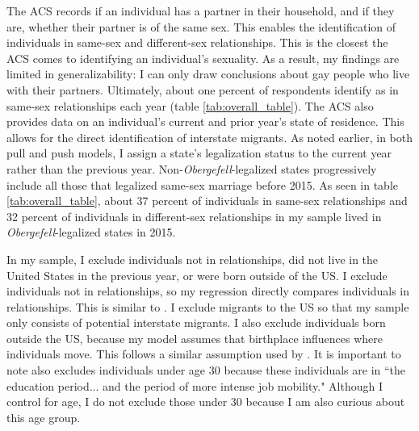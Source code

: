 \documentclass[12pt,letterpaper]{article}
\begin{document}
The ACS records if an individual has a partner in their household, and if they are, whether their partner is of the same sex. This enables the identification of individuals in same-sex and different-sex relationships. This is the closest the ACS comes to identifying an individual's sexuality. As a result, my findings are limited in generalizability: I can only draw conclusions about gay people who live with their partners. Ultimately, about one percent of respondents identify as in same-sex relationships each year (table \ref{tab:overall_table}). The ACS also provides data on an individual's current and prior year's state of residence. This allows for the direct identification of interstate migrants. As noted earlier, in both pull and push models, I assign a state's legalization status to the current year rather than the previous year. Non-\textit{Obergefell}-legalized states progressively include all those that legalized same-sex marriage before 2015. As seen in table \ref{tab:overall_table}, about 37 percent of individuals in same-sex relationships and 32 percent of individuals in different-sex relationships in my sample lived in \textit{Obergefell}-legalized states in 2015.
\FloatBarrier


In my sample, I exclude individuals not in relationships, did not live in the United States in the previous year, or were born outside of the US. I exclude individuals not in relationships, so my regression directly compares individuals in relationships. This is similar to \citet{1}. I exclude migrants to the US so that my sample only consists of potential interstate migrants. I also exclude individuals born outside the US, because my model assumes that birthplace influences where individuals move. This follows a similar assumption used by \citet{12}. It is important to note \citet{1} also excludes individuals under age 30 because these individuals are in ``the education period... and the period of more intense job mobility." Although I control for age, I do not exclude those under 30 because I am also curious about this age group.
\end{document}

